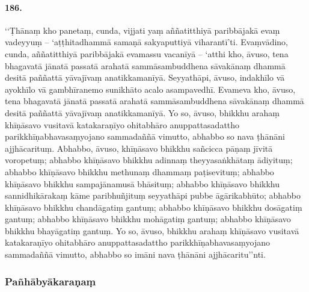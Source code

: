 \paragraph{186.} ‘‘Ṭhānaṃ kho panetaṃ, cunda, vijjati yaṃ aññatitthiyā paribbājakā evaṃ vadeyyuṃ – ‘aṭṭhitadhammā samaṇā sakyaputtiyā viharantī’ti. Evaṃvādino, cunda, aññatitthiyā paribbājakā evamassu vacanīyā – ‘atthi kho, āvuso, tena bhagavatā jānatā passatā arahatā sammāsambuddhena sāvakānaṃ dhammā desitā paññattā yāvajīvaṃ anatikkamanīyā. Seyyathāpi, āvuso, indakhīlo vā ayokhīlo vā gambhīranemo sunikhāto acalo asampavedhī. Evameva kho, āvuso, tena bhagavatā jānatā passatā arahatā sammāsambuddhena sāvakānaṃ dhammā desitā paññattā yāvajīvaṃ anatikkamanīyā. Yo so, āvuso, bhikkhu arahaṃ khīṇāsavo vusitavā katakaraṇīyo ohitabhāro anuppattasadattho parikkhīṇabhavasaṃyojano sammadaññā vimutto, abhabbo so nava ṭhānāni ajjhācarituṃ. Abhabbo, āvuso, khīṇāsavo bhikkhu sañcicca pāṇaṃ jīvitā voropetuṃ; abhabbo khīṇāsavo bhikkhu adinnaṃ theyyasaṅkhātaṃ ādiyituṃ; abhabbo khīṇāsavo bhikkhu methunaṃ dhammaṃ paṭisevituṃ; abhabbo khīṇāsavo bhikkhu sampajānamusā bhāsituṃ; abhabbo khīṇāsavo bhikkhu sannidhikārakaṃ kāme paribhuñjituṃ seyyathāpi pubbe āgārikabhūto; abhabbo khīṇāsavo bhikkhu chandāgatiṃ gantuṃ; abhabbo khīṇāsavo bhikkhu dosāgatiṃ gantuṃ; abhabbo khīṇāsavo bhikkhu mohāgatiṃ gantuṃ; abhabbo khīṇāsavo bhikkhu bhayāgatiṃ gantuṃ. Yo so, āvuso, bhikkhu arahaṃ khīṇāsavo vusitavā katakaraṇīyo ohitabhāro anuppattasadattho parikkhīṇabhavasaṃyojano sammadaññā vimutto, abhabbo so imāni nava ṭhānāni ajjhācaritu’’nti.

\subsubsection{Pañhābyākaraṇaṃ}

